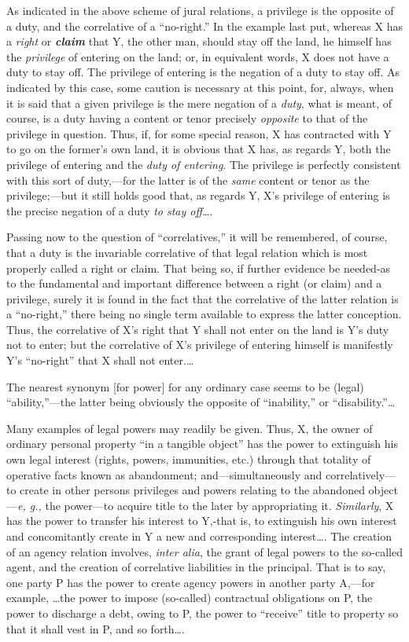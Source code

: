 As indicated in the above scheme of jural relations, a privilege is the opposite
of a duty, and the correlative of a ``no-right.'' In the example last put,
whereas X has a \textit{right} or \textbf{\textit{claim}} that Y, the other
man, should stay off the land, he himself has the \textit{privilege} of
entering on the land; or, in equivalent words, X does not have a duty to stay
off. The privilege of entering is the negation of a duty to stay off. As
indicated by this case, some caution is necessary at this point, for, always,
when it is said that a given privilege is the mere negation of a \textit{duty},
what is meant, of course, is a duty having a content or tenor precisely
\textit{opposite} to that of the privilege in question. Thus, if, for some
special reason, X has contracted with Y to go on the former's own land, it is
obvious that X has, as regards Y, both the privilege of entering and the
\textit{duty of entering}. The privilege is perfectly consistent with this sort
of duty,---for the latter is of the \textit{same} content or tenor as the
privilege;---but it still holds good that, as regards Y, X's
privilege of entering is the precise negation of a duty \textit{to stay
off}\ldots.

Passing now to the question of ``correlatives,'' it will be remembered, of
course, that a duty is the invariable correlative of that legal relation which
is most properly called a right or claim. That being so, if further evidence be
needed-as to the fundamental and important difference between a right (or
claim) and a privilege, surely it is found in the fact that the correlative of
the latter relation is a ``no-right,'' there being no single term available to
express the latter conception. Thus, the correlative of X's right that Y shall
not enter on the land is Y's duty not to enter; but the correlative of X's
privilege of entering himself is manifestly Y's ``no-right'' that X shall not
enter.\ldots

The nearest synonym [for power] for any ordinary case seems to be (legal)
``ability,''---the latter being obviously the opposite of ``inability,'' or
``disability.''\ldots

Many examples of legal powers may readily be given. Thus, X, the owner of
ordinary personal property ``in a tangible object'' has the power to extinguish
his own legal interest (rights, powers, immunities, etc.) through that totality
of operative facts known as abandonment; and---simultaneously and
correlatively---to create in other persons privileges and powers relating to
the abandoned object---\textit{e, g.,} the power---to acquire title to the
later by appropriating it. \textit{Similarly}, X has the power to transfer his
interest to Y,-that is, to extinguish his own interest and concomitantly create
in Y a new and corresponding interest\ldots. The creation of an agency relation
involves, \textit{inter alia}, the grant of legal powers to the so-called
agent, and the creation of correlative liabilities in the principal. That is to
say, one party P has the power to create agency powers in another party
A,---for example, \ldots the power to impose (so-called) contractual
obligations on P, the power to discharge a debt, owing to P, the power to
``receive'' title to property so that it shall vest in P, and so forth\ldots .

